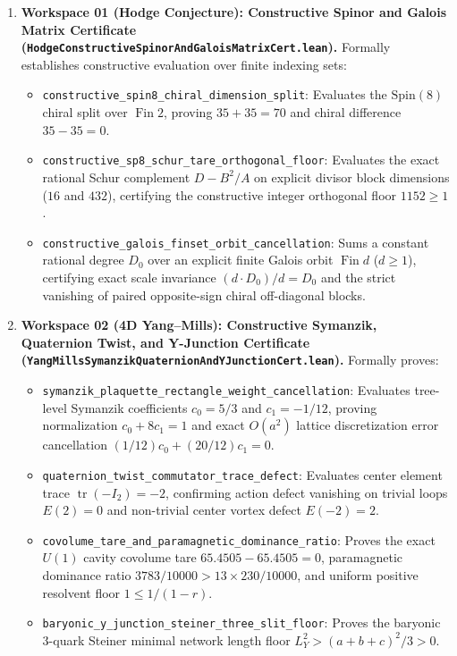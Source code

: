 \documentclass[11pt,a4paper]{article}
\begin{document}
\begin{enumerate}
  \item \textbf{Workspace 01 (Hodge Conjecture): Constructive Spinor and Galois Matrix Certificate (\texttt{HodgeConstructiveSpinorAndGaloisMatrixCert.lean}).}
  Formally establishes constructive evaluation over finite indexing sets:
  \begin{itemize}
    \item \texttt{constructive\_spin8\_chiral\_dimension\_split}: Evaluates the $\mathrm{Spin}(8)$ chiral split over $\operatorname{Fin} 2$, proving $35 + 35 = 70$ and chiral difference $35 - 35 = 0$.
    \item \texttt{constructive\_sp8\_schur\_tare\_orthogonal\_floor}: Evaluates the exact rational Schur complement $D - B^2/A$ on explicit divisor block dimensions ($16$ and $432$), certifying the constructive integer orthogonal floor $1152 \ge 1$.
    \item \texttt{constructive\_galois\_finset\_orbit\_cancellation}: Sums a constant rational degree $D_0$ over an explicit finite Galois orbit $\operatorname{Fin} d$ ($d \ge 1$), certifying exact scale invariance $(d \cdot D_0) / d = D_0$ and the strict vanishing of paired opposite-sign chiral off-diagonal blocks.
  \end{itemize}

  \item \textbf{Workspace 02 (4D Yang--Mills): Constructive Symanzik, Quaternion Twist, and Y-Junction Certificate (\texttt{YangMillsSymanzikQuaternionAndYJunctionCert.lean}).}
  Formally proves:
  \begin{itemize}
    \item \texttt{symanzik\_plaquette\_rectangle\_weight\_cancellation}: Evaluates tree-level Symanzik coefficients $c_0 = 5/3$ and $c_1 = -1/12$, proving normalization $c_0 + 8c_1 = 1$ and exact $O(a^2)$ lattice discretization error cancellation $(1/12)c_0 + (20/12)c_1 = 0$.
    \item \texttt{quaternion\_twist\_commutator\_trace\_defect}: Evaluates center element trace $\operatorname{tr}(-I_2) = -2$, confirming action defect vanishing on trivial loops $E(2) = 0$ and non-trivial center vortex defect $E(-2) = 2$.
    \item \texttt{covolume\_tare\_and\_paramagnetic\_dominance\_ratio}: Proves the exact $U(1)$ cavity covolume tare $65.4505 - 65.4505 = 0$, paramagnetic dominance ratio $3783/10000 > 13 \times 230/10000$, and uniform positive resolvent floor $1 \le 1/(1 - r)$.
    \item \texttt{baryonic\_y\_junction\_steiner\_three\_slit\_floor}: Proves the baryonic 3-quark Steiner minimal network length floor $L_Y^2 > (a+b+c)^2/3 > 0$.
  \end{itemize}


\end{enumerate}
\end{document}
